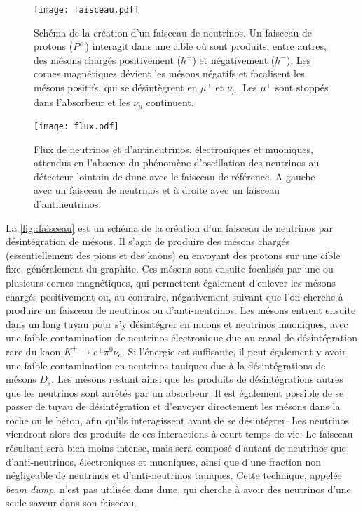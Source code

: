       \begin{figure}[htbp]
        \texttt{[image: faisceau.pdf]}
        \caption[Schéma de la création d'un faisceau de neutrinos]{\label{fig::faisceau}Schéma de la création d'un faisceau de neutrinos. Un faisceau de protons ($P^+$) interagit dans une cible où sont produits, entre autres, des mésons chargés positivement ($h^+$) et négativement ($h^-$). Les cornes magnétiques dévient les mésons négatifs et focalisent les mésons positifs, qui se désintègrent en $\mu^+$ et $\nu_{\mu}$. Les $\mu^+$ sont stoppés dans l'absorbeur et les $\nu_{\mu}$ continuent.}
      \end{figure}
      \begin{figure}[htbp]
        \texttt{[image: flux.pdf]}
        \caption[Flux de neutrinos attendus sans oscillations dans DU$\nu$E]{\label{fig::flux}Flux de neutrinos et d'antineutrinos,  électroniques et muoniques, attendus en l'absence du phénomène d'oscillation des neutrinos au détecteur lointain de \gls{dune} avec le faisceau de référence. A gauche avec un faisceau de neutrinos et à droite avec un faisceau d'antineutrinos.}
      \end{figure}
      La \autoref{fig::faisceau} est un schéma de la création d'un faisceau de neutrinos par désintégration de mésons. Il s'agit de produire des mésons chargés (essentiellement des pions et des kaons) en envoyant des protons sur une cible fixe, généralement du graphite. Ces mésons sont ensuite focalisés par une ou plusieurs cornes magnétiques, qui permettent également d'enlever les mésons chargés positivement ou, au contraire, négativement suivant que l'on cherche à produire un faisceau de neutrinos ou d'anti-neutrinos. Les mésons entrent ensuite dans un long tuyau pour s'y désintégrer en muons et neutrinos muoniques, avec une faible contamination de neutrinos électronique due au canal de désintégration rare du kaon $K^+ \to e^+ \pi^0 \nu_e$. Si l'énergie est suffisante, il peut également y avoir une faible contamination en neutrinos tauiques due à la désintégrations de mésons $D_s$. Les mésons restant ainsi que les produits de désintégrations autres que les neutrinos sont arrêtés par un absorbeur. Il est également possible de se passer de tuyau de désintégration et d'envoyer directement les mésons dans la roche ou le béton, afin qu'ils interagissent avant de se désintégrer. Les neutrinos viendront alors des produits de ces interactions à court temps de vie. Le faisceau résultant sera bien moins intense, mais sera composé d'autant de neutrinos que d'anti-neutrinos, électroniques et muoniques, ainsi que d'une fraction non négligeable de neutrinos et d'anti-neutrinos tauiques. Cette technique, appelée \textit{beam dump}, n'est pas utilisée dans \gls{dune}, qui cherche à avoir des neutrinos d'une seule saveur dans son faisceau.
        
